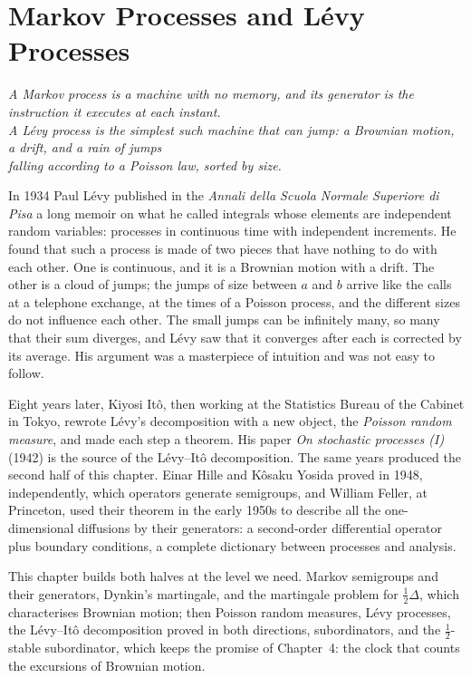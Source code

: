 \chapter{Markov Processes and L\'evy Processes}

\begin{center}\itshape
A Markov process is a machine with no memory, and its generator is the instruction it executes at each instant.\\
A L\'evy process is the simplest such machine that can jump: a Brownian motion, a drift, and a rain of jumps\\
falling according to a Poisson law, sorted by size.
\end{center}

In 1934 Paul L\'evy published in the \emph{Annali della Scuola Normale Superiore di Pisa} a long memoir on what he called integrals whose elements are independent random variables: processes in
continuous time with independent increments. He found that such a process is made of two pieces that have nothing to do with each other. One is continuous, and it is a Brownian motion with a drift.
The other is a cloud of jumps; the jumps of size between $a$ and $b$ arrive like the calls at a telephone exchange, at the times of a Poisson process, and the different sizes do not influence each
other. The small jumps can be infinitely many, so many that their sum diverges, and L\'evy saw that it converges after each is corrected by its average. His argument was a masterpiece of intuition and was
not easy to follow.

Eight years later, Kiyosi It\^o, then working at the Statistics Bureau of the Cabinet in Tokyo, rewrote L\'evy's decomposition with a new object, the \emph{Poisson random measure}, and made each
step a theorem. His paper \emph{On stochastic processes (I)} (1942) is the source of the L\'evy--It\^o decomposition. The same years produced the second half of this chapter. Einar Hille and K\^osaku Yosida proved in 1948, independently, which operators generate semigroups, and William Feller, at
Princeton, used their theorem in the early 1950s to describe all the one-dimensional diffusions by their generators: a second-order differential operator plus boundary conditions, a complete
dictionary between processes and analysis.

This chapter builds both halves at the level we need. Markov semigroups and their generators, Dynkin's martingale, and the martingale problem for $\frac12\Delta$, which characterises Brownian motion;
then Poisson random measures, L\'evy processes, the L\'evy--It\^o decomposition proved in both directions, subordinators, and the $\frac12$-stable subordinator, which keeps the promise of Chapter~4: the
clock that counts the excursions of Brownian motion.

